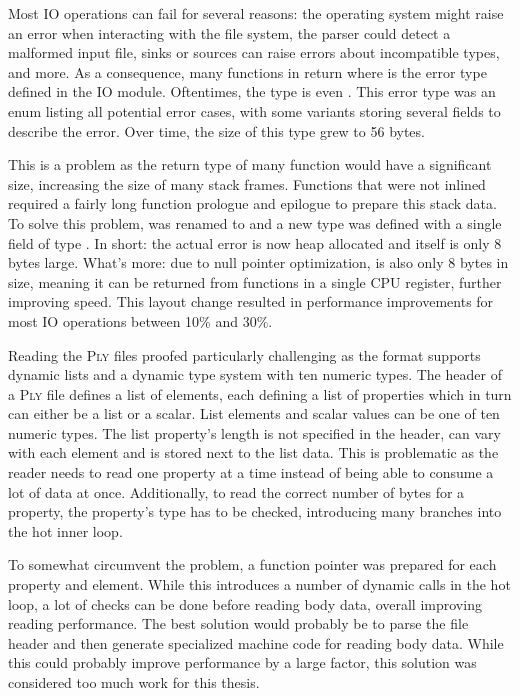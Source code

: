 Most IO operations can fail for several reasons: the operating system might raise an error when interacting with the file system, the parser could detect a malformed input file, sinks or sources can raise errors about incompatible types, and more.
As a consequence, many functions in  return  where  is the error type defined in the IO module.
Oftentimes, the  type is even \code{()}.
This error type was an enum listing all potential error cases, with some variants storing several fields to describe the error.
Over time, the size of this type grew to 56 bytes.

This is a problem as the return type of many function would have a significant size, increasing the size of many stack frames.
Functions that were not inlined required a fairly long function prologue and epilogue to prepare this stack data.
To solve this problem,  was renamed to  and a new type  was defined with a single field of type .
In short: the actual error is now heap allocated and  itself is only 8 bytes large. What's more: due to null pointer optimization,  is also only 8 bytes in size, meaning it can be returned from functions in a single CPU register, further improving speed.
This layout change resulted in performance improvements for most IO operations between 10\% and 30\%.

Reading the \textsc{Ply} files proofed particularly challenging as the format supports dynamic lists and a dynamic type system with ten numeric types.
The header of a \textsc{Ply} file defines a list of elements, each defining a list of properties which in turn can either be a list or a scalar.
List elements and scalar values can be one of ten numeric types.
The list property's length is not specified in the header, can vary with each element and is stored next to the list data.
This is problematic as the reader needs to read one property at a time instead of being able to consume a lot of data at once.
Additionally, to read the correct number of bytes for a property, the property's type has to be checked, introducing many branches into the hot inner loop.

To somewhat circumvent the problem, a function pointer was prepared for each property and element.
While this introduces a number of dynamic calls in the hot loop, a lot of checks can be done before reading body data, overall improving reading performance.
The best solution would probably be to parse the file header and then generate specialized machine code for reading body data.
While this could probably improve performance by a large factor, this solution was considered too much work for this thesis.


